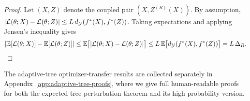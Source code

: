 \begin{proof}
Let $(X,Z)$ denote the coupled pair $(X,Z^{(R)}(X))$. By assumption,
$|\mathcal{L}(\theta;X)-\mathcal{L}(\theta;Z)|\le L\,d_{\mathcal{Y}}(f^{\ast}(X),f^{\ast}(Z))$.
Taking expectations and applying Jensen's inequality gives
\[
|\mathbb{E}[\mathcal{L}(\theta;X)]-\mathbb{E}[\mathcal{L}(\theta;Z)]|
\le \mathbb{E}\big[|\mathcal{L}(\theta;X)-\mathcal{L}(\theta;Z)|\big]
\le L\,\mathbb{E}\big[d_{\mathcal{Y}}(f^{\ast}(X),f^{\ast}(Z))\big]
= L\,\Delta_R.
\]
\end{proof}

The adaptive-tree optimizer-transfer results are collected separately in
Appendix~\ref{app:adaptive-tree-proofs}, where we give full human-readable
proofs for both the expected-tree perturbation theorem and its
high-probability version.
